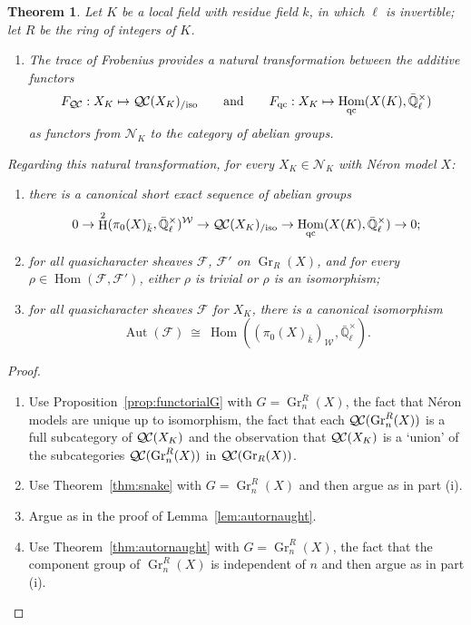 \documentclass[CM,Submssn,SecEq]{degruyter-crelle} %
\theoremstyle{plain}
\newtheorem{theorem}{Theorem}[section]
\theoremstyle{definition}
\theoremstyle{remark}
\newcommand{\EE}{\mathbb{\bar Q}_\ell}
\newcommand{\bFq}{\bar{k}}
\newcommand{\Fq}{k}
\newcommand{\EEx}{\EE^\times}
\newcommand{\Weil}[1]{\mathcal{W}_{#1}}
\DeclareMathOperator{\Aut}{Aut}
\DeclareMathOperator{\Hom}{Hom}
\DeclareMathOperator{\Gr}{Gr}
\DeclareMathOperator{\Hh}{H}
\newcommand{\iso}{{\ \cong\ }}
\newcommand{\qcs}[1]{{\mathcal{#1}}}
\newcommand{\QC}{{\mathcal{Q\hskip-0.8pt C}}}
\newcommand{\QCiso}[1]{\QC(#1)_{/\text{iso}}}
\begin{document}
\begin{theorem}\label{thm:QCXK}
Let $K$ be a local field with residue field $\Fq$, in which $\ell$ is invertible; 
let $R$ be the ring of integers of $K$.
\begin{enumerate}
\item
The trace of Frobenius provides a natural transformation between the additive functors
\[
F_{\QC}: X_K \mapsto \QCiso{X_K}
\qquad\text{and}\qquad
F_{\text{qc}}: X_K \mapsto \Hom_{\text{qc}}(X(K),\EEx)
\]
as functors from $\mathcal{N}_K$ to the category of abelian groups.
\end{enumerate} 
Regarding this natural transformation, for every $X_K \in \mathcal{N}_K$ with N\'eron model $X$:
\begin{enumerate}[resume]
\item there is a canonical short exact sequence of abelian groups 
\[
0 \to \Hh^2(\pi_0(X)_{\bFq},\EEx)^{\Weil{}} \to \QCiso{X_K} \to \Hom_\text{qc}(X(K),\EEx) \to 0;
\] 
\item for all quasicharacter sheaves $\qcs{F}$, $\qcs{F}'$ on $\Gr_R(X)$, and for every $\rho \in \Hom(\qcs{F},\qcs{F}')$, either $\rho$ is trivial or $\rho$ is an isomorphism;
\item for all quasicharacter sheaves $\qcs{F}$ for $X_K$, there is a canonical isomorphism
\[
\Aut(\qcs{F}) \iso \Hom((\pi_0(X)_{\bFq})_{\Weil{}},\EEx).
\]
\end{enumerate}
\end{theorem}

\begin{proof}
\begin{enumerate}
\item Use Proposition~\ref{prop:functorialG} with $G = \Gr^R_n(X)$, the fact that N\'eron models are unique up to isomorphism, the fact that each $\QC(\Gr^R_n(X))$ is a full subcategory of $\QC(X_K)$ and the observation that $\QC(X_K)$ is a `union' of the subcategories $\QC(\Gr^R_n(X))$ in $\QC(\Gr_R(X))$.
\item Use Theorem~\ref{thm:snake} with $G = \Gr^R_n(X)$ and then argue as in part (i).
\item Argue as in the proof of Lemma~\ref{lem:autornaught}.
\item Use Theorem~\ref{thm:autornaught} with $G = \Gr^R_n(X)$, the fact that the component group of $\Gr^R_n(X)$ is independent of $n$ and then argue as in part (i).
\end{enumerate}
\end{proof}
\end{document}

